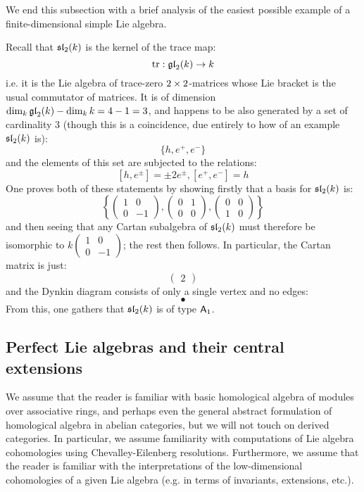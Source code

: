         We end this subsection with a brief analysis of the easiest possible example of a finite-dimensional simple Lie algebra. 
        \begin{example}[$\sl_2$]
            Recall that $\sl_2(k)$ is the kernel of the trace map:
                $$\trace: \gl_2(k) \to k$$
            i.e. it is the Lie algebra of trace-zero $2 \x 2$-matrices whose Lie bracket is the usual commutator of matrices. It is of dimension $\dim_k \gl_2(k) - \dim_k k = 4 - 1 = 3$, and happens to be also generated by a set of cardinality $3$ (though this is a coincidence, due entirely to how  of an example $\sl_2(k)$ is):
                $$\{h, e^+, e^-\}$$
            and the elements of this set are subjected to the relations:
                $$[h, e^{\pm}] = \pm 2 e^{\pm}, [e^+, e^-] = h$$
            One proves both of these statements by showing firstly that a basis for $\sl_2(k)$ is:
                $$\left\{ \begin{pmatrix} 1 & 0 \\ 0 & -1 \end{pmatrix}, \begin{pmatrix} 0 & 1 \\ 0 & 0 \end{pmatrix}, \begin{pmatrix} 0 & 0 \\ 1 & 0 \end{pmatrix} \right\}$$
            and then seeing that any Cartan subalgebra of $\sl_2(k)$ must therefore be isomorphic to $k \begin{pmatrix} 1 & 0 \\ 0 & -1 \end{pmatrix}$; the rest then follows. In particular, the Cartan matrix is just:
                $$\begin{pmatrix} 2 \end{pmatrix}$$
            and the Dynkin diagram consists of only a single vertex and no edges:
                $$\bullet$$
            From this, one gathers that $\sl_2(k)$ is of type $\sfA_1$. 
        \end{example}

    \subsection{Perfect Lie algebras and their central extensions}
        \begin{convention}
            We assume that the reader is familiar with basic homological algebra of modules over associative rings, and perhaps even the general abstract formulation of homological algebra in abelian categories, but we will not touch on derived categories. In particular, we assume familiarity with computations of Lie algebra cohomologies using Chevalley-Eilenberg resolutions. Furthermore, we assume that the reader is familiar with the interpretations of the low-dimensional cohomologies of a given Lie algebra (e.g. in terms of invariants, extensions, etc.).
        \end{convention}
    
